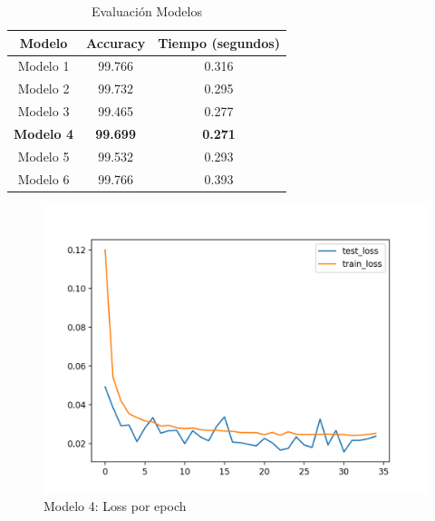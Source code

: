 \documentclass[a4paper, 11pt]{article}
\begin{document}
			
		\begin{table}[htb!]
			\centering
			\caption{Evaluación Modelos}
			\label{evaluacion-modelos}
			\begin{tabular}{|c|c|c|}
				\hline
				\textbf{Modelo}                                                 & \textbf{Accuracy} & \textbf{Tiempo (segundos)} \\ \hline
				Modelo 1                                                            & 99.766                & 0.316               \\ \hline
				Modelo 2                                                              & 99.732                & 0.295              \\ \hline
				Modelo 3                                                   & 99.465                & 0.277                \\ \hline
				\textbf{Modelo 4}                                                    & \textbf{99.699}             & \textbf{0.271}               \\ \hline
				Modelo 5                                                    & 99.532             & 0.293               \\ \hline
				Modelo 6                                                    & 99.766             & 0.393               \\ \hline
			\end{tabular}
		\end{table}
			
			
			\begin{figure}[htb!]
				\begin{minipage}{1\textwidth}
					\centering
					\includegraphics[scale=.5]{pics/model4_losses_per_epoch}
					\caption{Modelo 4: Loss por epoch}
					\label{fig:model4_losses_per_epoch}
				\end{minipage}\hfill
			\end{figure}
		
\end{document}
